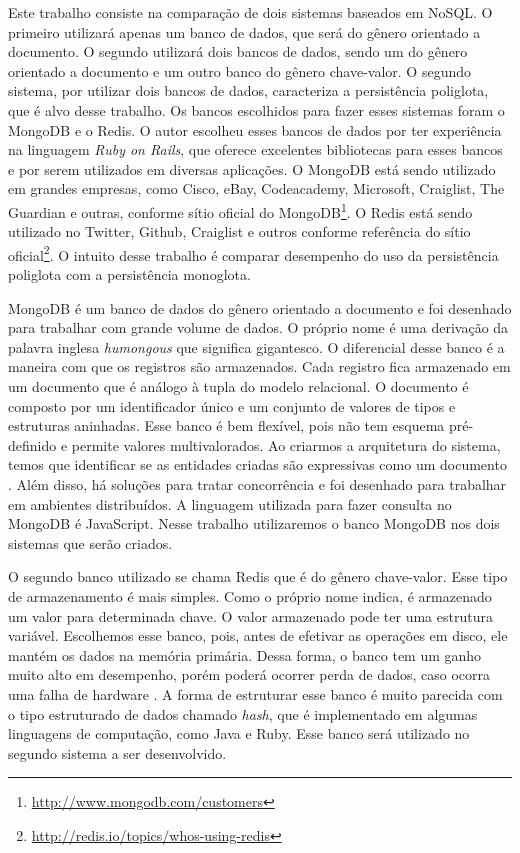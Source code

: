 Este trabalho consiste na comparação de dois sistemas baseados em NoSQL. O primeiro utilizará apenas um banco de dados, que será do gênero orientado a documento. O segundo utilizará dois bancos de dados, sendo um do gênero orientado a documento e um outro banco do gênero chave-valor. O segundo sistema, por utilizar dois bancos de dados, caracteriza a persistência poliglota, que é alvo desse trabalho. Os bancos escolhidos para fazer esses sistemas foram o MongoDB e o \ac{Redis}. O autor escolheu esses bancos de dados por ter experiência na linguagem \textit{Ruby on Rails}, que oferece excelentes bibliotecas para esses bancos e por serem utilizados em diversas aplicações. O MongoDB está sendo utilizado em grandes empresas, como Cisco, eBay, Codeacademy, Microsoft, Craiglist, The Guardian e outras, conforme sítio oficial do MongoDB\footnote{\url{http://www.mongodb.com/customers}}. O \ac{Redis} está sendo utilizado no Twitter, Github, Craiglist e outros conforme referência do sítio oficial\footnote{\url{http://redis.io/topics/whos-using-redis}}.
O intuito desse trabalho é comparar desempenho do uso da persistência poliglota  com a persistência monoglota.

MongoDB é um banco de dados do gênero orientado a documento e foi desenhado para trabalhar com grande volume de dados. O próprio nome é uma derivação da palavra inglesa \textit{humongous} que significa gigantesco. O diferencial desse banco é a maneira com que os registros são armazenados. Cada registro fica armazenado em um documento que é análogo à tupla do modelo relacional. O documento é composto por um identificador único e um conjunto de valores de tipos e estruturas aninhadas. Esse banco é bem flexível, pois não tem esquema pré-definido e permite valores multivalorados. Ao criarmos a arquitetura do sistema, temos que identificar se as entidades criadas são expressivas como um documento \cite{SDSW}. Além disso, há soluções para tratar concorrência e foi desenhado para trabalhar em ambientes distribuídos. A linguagem utilizada para fazer consulta no MongoDB é JavaScript. Nesse trabalho utilizaremos o banco MongoDB nos dois sistemas que serão criados.

O segundo banco utilizado se chama \ac{Redis} que é do gênero chave-valor. Esse tipo de armazenamento é mais simples. Como o próprio nome indica, é armazenado um valor para determinada chave. O valor armazenado pode ter uma estrutura variável. Escolhemos esse banco, pois, antes de efetivar as operações em disco, ele mantém os dados na memória primária. Dessa forma, o banco tem um ganho muito alto em desempenho, porém poderá ocorrer perda de dados, caso ocorra uma falha de hardware \cite{SDSW}. A forma de estruturar esse banco é muito parecida com o tipo estruturado de dados chamado \textit{hash}, que é implementado em algumas linguagens de computação, como Java e Ruby. Esse banco será utilizado no segundo sistema a ser desenvolvido.


